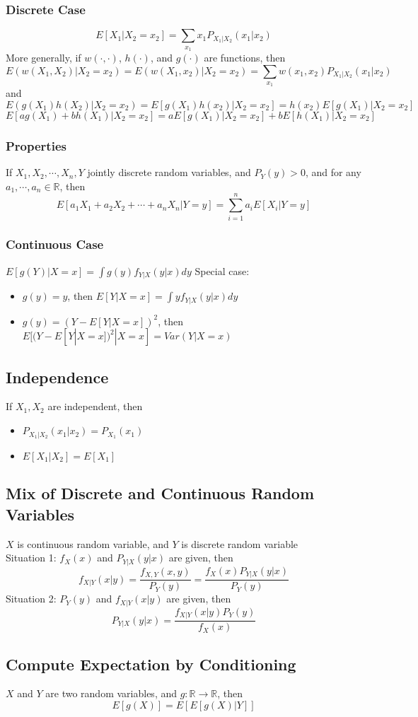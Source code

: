 \documentclass[11pt]{article}
\newcommand{\R}{{\mathbb{R}}}
\newcommand{\ds}{\displaystyle}
\begin{document}
\subsubsection*{Discrete Case}
\[E[X_1|X_2=x_2]=\sum_{x_1}x_1P_{X_1|X_2}(x_1|x_2)\]
More generally, if $w(\cdot,\cdot)$, $h(\cdot)$, and $g(\cdot)$ are functions, then
\[E(w(X_1,X_2)|X_2=x_2)=E(w(X_1,x_2)|X_2=x_2)=\sum_{x_1}w(x_1,x_2)P_{X_1|X_2}(x_1|x_2)\]
and 
\[E(g(X_1)h(X_2)|X_2=x_2)=E[g(X_1)h(x_2)|X_2=x_2]=h(x_2)E[g(X_1)|X_2=x_2]\]   
\[E[ag(X_1)+bh(X_1)|X_2=x_2]=aE[g(X_1)|X_2=x_2]+bE[h(X_1)|X_2=x_2]\]
\subsubsection*{Properties}
If $X_1,X_2,\cdots,X_n,Y$ jointly discrete random variables, and $P_Y(y)>0$, and for any $a_1,\cdots,a_n\in\R$, then
\[E[a_1X_1+a_2X_2+\cdots+a_nX_n|Y=y]=\sum_{i=1}^{n}a_iE[X_i|Y=y]\]
\subsubsection*{Continuous Case}
$E[g(Y)|X=x] = \ds\int g(y)f_{Y|X}(y|x)dy$ 
Special case: 
\begin{itemize}
    \item $g(y)=y$, then $E[Y|X=x]=\ds\int yf_{Y|X}(y|x)dy$
    \item $g(y)=(Y-E[Y|X=x])^2$, then $E[(Y-E[Y|X=x])^2|X=x]=Var(Y|X=x)$
\end{itemize}
\subsection{Independence}
If $X_1,X_2$ are independent, then 
\begin{itemize}
    \item $P_{X_1|X_2}(x_1|x_2)=P_{X_1}(x_1)$
    \item $E[X_1|X_2]=E[X_1]$
\end{itemize}
\subsection{Mix of Discrete and Continuous Random Variables}
$X$ is continuous random variable, and $Y$ is discrete random variable \\
Situation 1: $f_X(x)$ and $P_{Y|X}(y|x)$ are given, then 
\[f_{X|Y}(x|y) = \frac{f_{X,Y}(x,y)}{P_Y(y)}=\frac{f_X(x)P_{Y|X}(y|x)}{P_Y(y)}\]
Situation 2: $P_Y(y)$ and $f_{X|Y}(x|y)$ are given, then
\[P_{Y|X}(y|x)=\frac{f_{X|Y}(x|y)P_Y(y)}{f_X(x)}\]
\subsection{Compute Expectation by Conditioning}
$X$ and $Y$ are two random variables, and $g:\R\to\R$, then 
\[E[g(X)]=E[E[g(X)|Y]]\]
\end{document}
